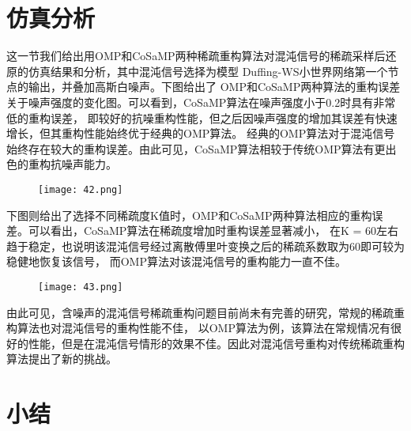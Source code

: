 \section{仿真分析}
这一节我们给出用OMP和CoSaMP两种稀疏重构算法对混沌信号的稀疏采样后还原的仿真结果和分析，其中混沌信号选择为模型
Duffing-WS小世界网络第一个节点的输出，并叠加高斯白噪声。下图给出了 
OMP和CoSaMP两种算法的重构误差关于噪声强度的变化图。可以看到，CoSaMP算法在噪声强度小于0.2时具有非常低的重构误差，
即较好的抗噪重构性能，但之后因噪声强度的增加其误差有快速增长，但其重构性能始终优于经典的OMP算法。
经典的OMP算法对于混沌信号始终存在较大的重构误差。由此可见，CoSaMP算法相较于传统OMP算法有更出色的重构抗噪声能力。
\begin{figure}[!htbp]
    \centering
    \texttt{[image: 42.png]}
\end{figure}
下图则给出了选择不同稀疏度K值时，OMP和CoSaMP两种算法相应的重构误差。可以看出，CoSaMP算法在稀疏度增加时重构误差显著减小，
在K = 60左右趋于稳定，也说明该混沌信号经过离散傅里叶变换之后的稀疏系数取为60即可较为稳健地恢复该信号，
而OMP算法对该混沌信号的重构能力一直不佳。
\begin{figure}[!htbp]
    \centering
    \texttt{[image: 43.png]}
\end{figure}
由此可见，含噪声的混沌信号稀疏重构问题目前尚未有完善的研究，常规的稀疏重构算法也对混沌信号的重构性能不佳，
以OMP算法为例，该算法在常规情况有很好的性能，但是在混沌信号情形的效果不佳。因此对混沌信号重构对传统稀疏重构算法提出了新的挑战。
\section{小结}